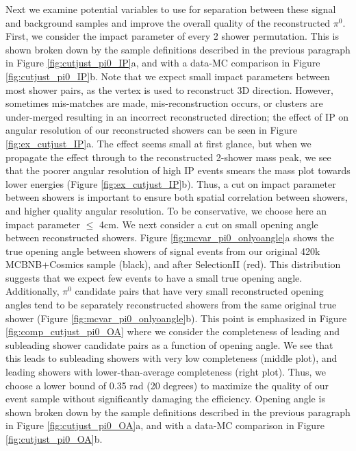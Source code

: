 Next we examine potential variables to use for separation between these signal and background samples  and improve the overall quality of the reconstructed $\pi^{0}$.  First, we consider the impact parameter of every 2 shower permutation.  This is shown broken down by the sample definitions described in the previous paragraph in Figure \ref{fig:cutjust_pi0_IP}a, and with a data-MC comparison in Figure \ref{fig:cutjust_pi0_IP}b.  Note that we expect small impact parameters between most shower pairs, as the vertex is used to reconstruct 3D direction. However, sometimes mis-matches are made, mis-reconstruction occurs, or clusters are under-merged resulting in an incorrect reconstructed direction; the effect of IP on angular resolution of our reconstructed showers can be seen in Figure \ref{fig:ex_cutjust_IP}a. The effect seems small at first glance, but when we propagate the effect through to the reconstructed 2-shower mass peak, we see that the poorer angular resolution of high IP events smears the mass plot towards lower energies (Figure \ref{fig:ex_cutjust_IP}b). Thus, a cut on impact parameter between showers is important to ensure both spatial correlation between showers, and higher quality angular resolution.  To be conservative, we choose here an impact parameter $\leq$ 4cm.  
We next consider a cut on small opening angle between reconstructed showers. Figure \ref{fig:mcvar_pi0_onlyoangle}a shows the true opening angle between showers of signal events from our original 420k MCBNB+Cosmics sample (black), and after SelectionII (red). This distribution suggests that we expect few events to have a small true opening angle. Additionally, $\pi^0$ candidate pairs that have very small reconstructed opening angles tend to be separately reconstructed showers from the same original true shower (Figure \ref{fig:mcvar_pi0_onlyoangle}b). This point is emphasized in Figure \ref{fig:comp_cutjust_pi0_OA} where we consider the completeness of leading and subleading shower candidate pairs as a function of opening angle. We see that this leads to subleading showers with very low completeness (middle plot), and leading showers with lower-than-average completeness (right plot). Thus, we choose a lower bound of 0.35 rad (20 degrees) to maximize the quality of our event sample without significantly damaging the efficiency. Opening angle is shown broken down by the sample definitions described in the previous paragraph in Figure \ref{fig:cutjust_pi0_OA}a, and with a data-MC comparison in Figure \ref{fig:cutjust_pi0_OA}b. %


